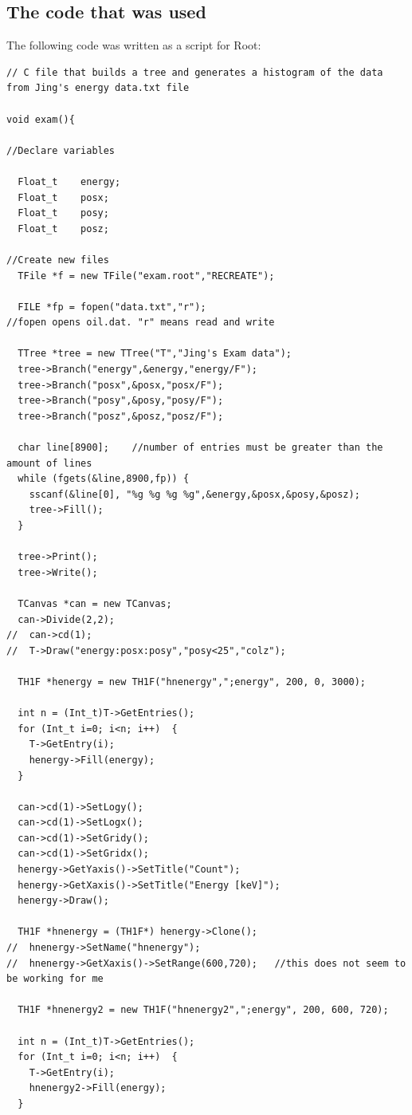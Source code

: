 \documentclass[letterpaper]{article}
\begin{document}
\subsection{The code that was used}
The following code was written as a script for Root:
\begin{lstlisting}
// C file that builds a tree and generates a histogram of the data from Jing's energy data.txt file

void exam(){

//Declare variables

  Float_t    energy;
  Float_t    posx;
  Float_t    posy;
  Float_t    posz;

//Create new files
  TFile *f = new TFile("exam.root","RECREATE");
  
  FILE *fp = fopen("data.txt","r");
//fopen opens oil.dat. "r" means read and write
  
  TTree *tree = new TTree("T","Jing's Exam data");
  tree->Branch("energy",&energy,"energy/F");
  tree->Branch("posx",&posx,"posx/F");
  tree->Branch("posy",&posy,"posy/F");
  tree->Branch("posz",&posz,"posz/F");
  
  char line[8900];    //number of entries must be greater than the amount of lines
  while (fgets(&line,8900,fp)) {
    sscanf(&line[0], "%g %g %g %g",&energy,&posx,&posy,&posz);
    tree->Fill();
  }
  
  tree->Print();
  tree->Write();
  
  TCanvas *can = new TCanvas;
  can->Divide(2,2);
//  can->cd(1);
//  T->Draw("energy:posx:posy","posy<25","colz");
  
  TH1F *henergy = new TH1F("hnenergy",";energy", 200, 0, 3000);

  int n = (Int_t)T->GetEntries();
  for (Int_t i=0; i<n; i++)  {
    T->GetEntry(i);
    henergy->Fill(energy);
  }
  
  can->cd(1)->SetLogy();
  can->cd(1)->SetLogx();
  can->cd(1)->SetGridy();
  can->cd(1)->SetGridx();
  henergy->GetYaxis()->SetTitle("Count");
  henergy->GetXaxis()->SetTitle("Energy [keV]");
  henergy->Draw();

  TH1F *hnenergy = (TH1F*) henergy->Clone();
//  hnenergy->SetName("hnenergy");
//  hnenergy->GetXaxis()->SetRange(600,720);   //this does not seem to be working for me
  
  TH1F *hnenergy2 = new TH1F("hnenergy2",";energy", 200, 600, 720);

  int n = (Int_t)T->GetEntries();
  for (Int_t i=0; i<n; i++)  {
    T->GetEntry(i);
    hnenergy2->Fill(energy);
  }


\end{lstlisting}
\end{document}
